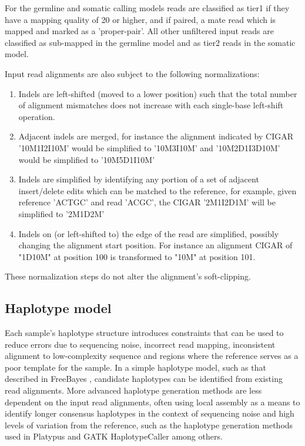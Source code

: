 \documentclass{article}
\begin{document}
For the germline and somatic calling models reads are classified as tier1 if they have a mapping quality of 20 or higher, and if paired, a mate read which is mapped and marked as a 'proper-pair'. All other unfiltered input reads are classified as sub-mapped in the germline model and as tier2 reads in the somatic model.

Input read alignments are also subject to the following normalizations:
\begin{enumerate}
    \item Indels are left-shifted (moved to a lower position) such that the total number of alignment mismatches does not increase with each single-base left-shift operation.
    \item Adjacent indels are merged, for instance the alignment indicated by CIGAR '10M1I2I10M' would be simplified to '10M3I10M' and '10M2D1I3D10M' would be simplified to '10M5D1I10M'
    \item Indels are simplified by identifying any portion of a set of adjacent insert/delete edits which can be matched to the reference, for example, given reference 'ACTGC' and read 'ACGC', the CIGAR '2M1I2D1M' will be simplified to '2M1D2M'
    \item Indels on (or left-shifted to) the edge of the read are simplified, possibly changing the alignment start position. For instance an alignment CIGAR of "1D10M" at position 100 is transformed to "10M" at position 101.
\end{enumerate}
These normalization steps do not alter the alignment's soft-clipping.

\subsection{Haplotype model}

Each sample's haplotype structure introduces constraints that can be used to reduce errors due to sequencing noise, incorrect read mapping, inconsistent alignment to low-complexity sequence and regions where the reference serves as a poor template for the sample. In a simple haplotype model, such as that described in FreeBayes \cite{garrison2012}, candidate haplotypes can be identified from existing read alignments. More advanced haplotype generation methods are less dependent on the input read alignments, often using local assembly as a means to identify longer consensus haplotypes in the context of sequencing noise and high levels of variation from the reference, such as the haplotype generation methods used in Platypus \cite{rimmer2014} and GATK HaplotypeCaller \cite{depristo2011} among others. 
\end{document}
